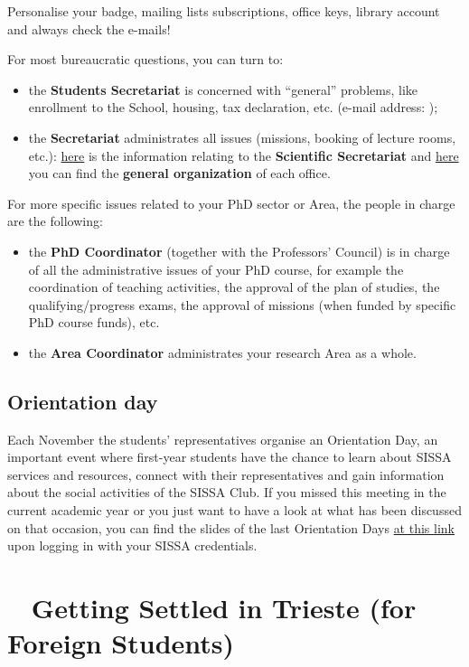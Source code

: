 \documentclass{sissavademecum}
\begin{document}
Personalise your badge, mailing lists subscriptions, office keys, library account and always check the e-mails!

\noindent For most bureaucratic questions, you can turn to:
\begin{itemize}
	\item the \textbf{Students Secretariat} is concerned with ``general'' problems, like enrollment to the School, housing, tax declaration, etc. (e-mail address: );
	\item the \textbf{Secretariat} administrates all issues (missions, booking of lecture rooms, etc.): \href{https://www.sissa.it/scientific-secretariat}{here} is the information relating to the \textbf{Scientific Secretariat} and \href{https://www.sissa.it/articolazione-degli-uffici}{here} you can find the \textbf{general organization} of each office.
\end{itemize}
For more specific issues related to your PhD sector or Area, the people in charge are the following:
\begin{itemize}
	\item the \textbf{PhD Coordinator} (together with the Professors' Council) is in charge of all the administrative issues of your PhD course, for example the coordination of teaching activities, the approval of the plan of studies, the qualifying/progress exams, the approval of missions (when funded by specific PhD course funds), etc.
    \item the \textbf{Area Coordinator} administrates your research Area as a whole.
\end{itemize}


\section{Orientation day}

Each November the students' representatives organise an Orientation Day, an important event where first-year students have the chance to learn about SISSA services and resources, connect with their representatives and gain information about the social activities of the SISSA Club. If you missed this meeting in the current academic year or you just want to have a look at what has been discussed on that occasion, you can find the slides of the last Orientation Days \href{https://www.sissa.it/orientation-day}{at this link} upon logging in with your SISSA credentials.




\chapter{\texorpdfstring{\faHome\ }{} Getting Settled in Trieste (for Foreign Students)}
\end{document}
